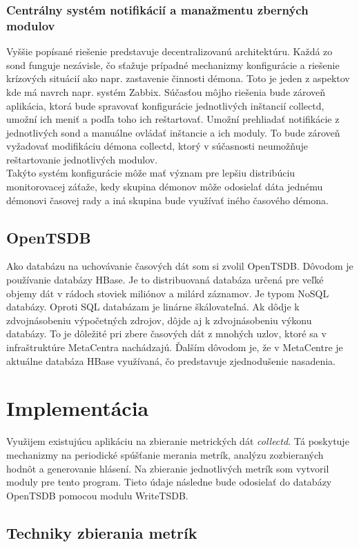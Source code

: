 \documentclass[11pt,final,oneside]{fithesis}
\begin{document}
\subsection{Centrálny systém notifikácií a manažmentu zberných modulov}
Vyššie popísané riešenie predstavuje decentralizovanú architektúru. Každá zo sond funguje nezávisle, čo sťažuje prípadné mechanizmy konfigurácie
a riešenie krízových situácií ako napr. zastavenie činnosti démona. Toto je jeden z aspektov kde má navrch napr. systém Zabbix. Súčasťou
môjho riešenia bude zároveň aplikácia, ktorá bude spravovať konfigurácie jednotlivých inštancií collectd, umožní ich meniť a podľa toho ich reštartovať.
Umožní prehliadať notifikácie z jednotlivých sond a manuálne ovládať inštancie a ich moduly. To bude zároveň vyžadovať modifikáciu démona
collectd, ktorý v súčasnosti neumožňuje reštartovanie jednotlivých modulov.
\\Takýto systém konfigurácie môže mať význam pre lepšiu distribúciu monitorovacej záťaže, kedy skupina démonov môže odosielať dáta jednému 
démonovi časovej rady a iná skupina bude využívať iného časového démona.

\section{OpenTSDB}
Ako databázu na uchovávanie časových dát som si zvolil OpenTSDB. Dôvodom je používanie databázy HBase. Je to distribuovaná databáza určená pre veľké objemy dát v rádoch stoviek miliónov a milárd záznamov. 
Je typom NoSQL databázy. Oproti SQL databázam je linárne škálovateľná. Ak dôdje k zdvojnásobeniu výpočetných zdrojov, dôjde aj k zdvojnásobeniu výkonu databázy. To je dôležité pri zbere časových dát z mnohých
uzlov, ktoré sa v infraštruktúre MetaCentra nachádzajú. Ďalším dôvodom je, že v MetaCentre je aktuálne databáza HBase využívaná, čo predstavuje zjednodušenie nasadenia. 


\chapter{Implementácia}
Využijem existujúcu aplikáciu na zbieranie metrických dát \emph{collectd}. Tá poskytuje mechanizmy na periodické spúšťanie merania metrík,
analýzu zozbieraných hodnôt a generovanie hlásení. Na zbieranie jednotlivých metrík som vytvoril moduly pre tento program. Tieto údaje následne bude odosielať do databázy OpenTSDB
pomocou modulu WriteTSDB.

\section{Techniky zbierania metrík}
\end{document}
